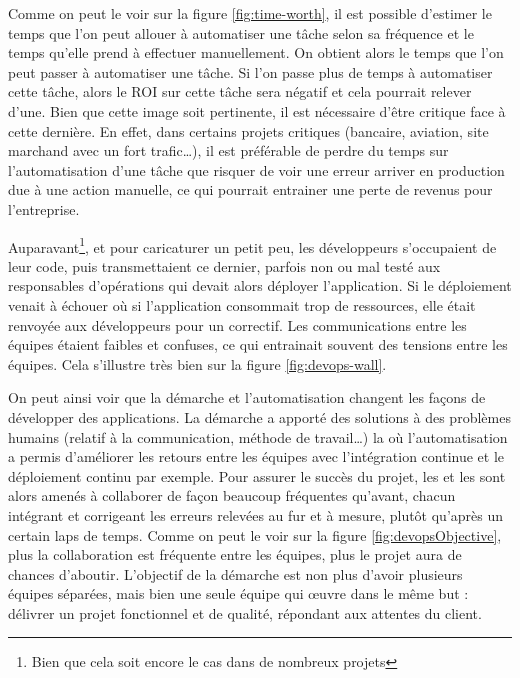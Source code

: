 Comme on peut le voir sur la figure \ref{fig:time-worth}, il est possible d'estimer le temps que l'on peut allouer à automatiser une tâche selon sa fréquence et le temps qu'elle prend à effectuer manuellement. On obtient alors le temps que l'on peut passer à automatiser une tâche. Si l'on passe plus de temps à automatiser cette tâche, alors le \gls{ROI} sur cette tâche sera négatif et cela pourrait relever d'une. Bien que cette image soit pertinente, il est nécessaire d'être critique face à cette dernière. En effet, dans certains projets critiques (bancaire, aviation, site marchand avec un fort trafic\ldots), il est préférable de perdre du temps sur l'automatisation d'une tâche que risquer de voir une erreur arriver en production due à une action manuelle, ce qui pourrait entrainer une perte de revenus pour l'entreprise.

Auparavant\footnote{Bien que cela soit encore le cas dans de nombreux projets}, et pour caricaturer un petit peu, les développeurs s'occupaient de leur code, puis transmettaient ce dernier, parfois non ou mal testé aux responsables d'opérations qui devait alors déployer l'application. Si le déploiement venait à échouer où si l'application consommait trop de ressources, elle était renvoyée aux développeurs pour un correctif. Les communications entre les équipes étaient faibles et confuses, ce qui entrainait souvent des tensions entre les équipes. Cela s'illustre très bien sur la figure \ref{fig:devops-wall}.


On peut ainsi voir que la démarche \devops{} et l'automatisation changent les façons de développer des applications. La démarche \devops{} a apporté des solutions à des problèmes humains (relatif à la communication, méthode de travail\ldots) la où l'automatisation a permis d'améliorer les retours entre les équipes avec l'intégration continue et le déploiement continu par exemple. Pour assurer le succès du projet, les \ops{} et les \dev{} sont alors amenés à collaborer de façon beaucoup fréquentes qu'avant, chacun intégrant et corrigeant les erreurs relevées au fur et à mesure, plutôt qu'après un certain laps de temps. Comme on peut le voir sur la figure \ref{fig:devopsObjective}, plus la collaboration est fréquente entre les équipes, plus le projet aura de chances d'aboutir. L'objectif de la démarche \devops{} est non plus d'avoir plusieurs équipes séparées, mais bien une seule équipe qui œuvre dans le même but : délivrer un projet fonctionnel et de qualité, répondant aux attentes du client.

